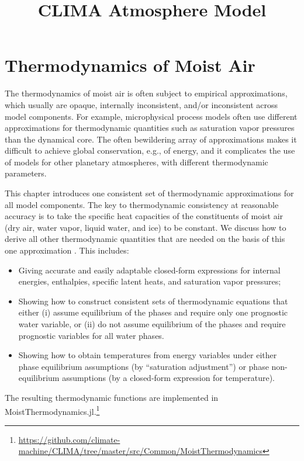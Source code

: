 \documentclass{report}
\title{CLIMA Atmosphere Model}
\author{ }
\begin{document}
\maketitle
\tableofcontents

\chapter{Thermodynamics of Moist Air}\label{s:thermodynamics}

The thermodynamics of moist air is often subject to empirical approximations, which usually are opaque, internally inconsistent, and/or inconsistent across model components. For example, microphysical process models often use different approximations for thermodynamic quantities such as saturation vapor pressures than the dynamical core. The often bewildering array of approximations makes it difficult to achieve global conservation, e.g., of energy, and it complicates the use of models for other planetary atmospheres, with different thermodynamic parameters. 

This chapter introduces one consistent set of thermodynamic approximations for all model components. The key to thermodynamic consistency at reasonable accuracy is to take the specific heat capacities of the constituents of moist air (dry air, water vapor, liquid water, and ice) to be constant. We discuss how to derive all other thermodynamic quantities that are needed on the basis of this one approximation \citep[cf.][]{Romps08a,Marquet16a}. This includes: 
\begin{itemize}
    \item Giving accurate and easily adaptable closed-form expressions for internal energies, enthalpies, specific latent heats, and saturation vapor pressures;
    \item Showing how to construct consistent sets of thermodynamic equations that either (i) assume equilibrium of the phases and require only one prognostic water variable, or (ii) do not assume equilibrium of the phases and require prognostic variables for all water phases.
    \item Showing how to obtain temperatures from energy variables under either phase equilibrium assumptions (by ``saturation adjustment'') or phase non-equilibrium assumptions (by a closed-form expression for temperature).
\end{itemize}
The resulting thermodynamic functions are implemented in MoistThermodynamics.jl.\footnote{\url{https://github.com/climate-machine/CLIMA/tree/master/src/Common/MoistThermodynamics}}
\end{document}
